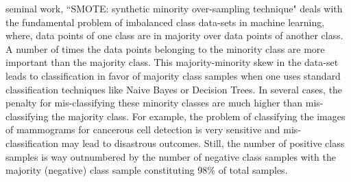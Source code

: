 \documentclass[10pt,journal,compsoc]{IEEEtran}
\begin{document}




% 
% 
% 
% 
 seminal work, ``SMOTE: synthetic minority over-sampling technique"\cite{smote} deals with the fundamental  problem of imbalanced class data-sets in machine learning, where, data points of one class are in majority over data points of another class. A number of times the data points belonging to the minority class are more important than the majority class. This majority-minority skew in the data-set leads to classification in favor of majority class samples when one uses standard classification techniques like Naive Bayes or Decision Trees. In several cases, the penalty for mis-classifying these minority classes are much higher than mis-classifying the majority class. For example, the problem of classifying the images of mammograms for cancerous cell detection is very sensitive and mis-classification may lead to disastrous outcomes. Still, the number of positive class samples is way outnumbered by the number of negative class samples with the majority (negative) class sample constituting 98\% of total samples.
\end{document}
